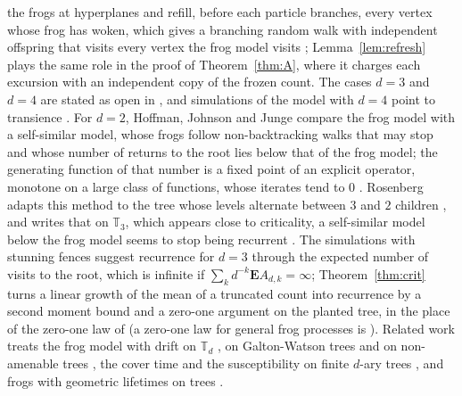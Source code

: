 \documentclass[11pt]{amsart}
\theoremstyle{definition}
\numberwithin{equation}{section}
\newcommand{\T}{\mathbb{T}}
\newcommand{\E}{\mathbf{E}}
\begin{document}
the frogs at hyperplanes and refill, before each particle branches, every vertex whose frog has woken, which gives a branching random walk with independent offspring that visits every vertex the frog model visits \cite[proof of Theorem~1.1(ii)]{DGHPW18}; Lemma~\ref{lem:refresh} plays the same role in the proof of Theorem~\ref{thm:A}, where it charges each excursion with an independent copy of the frozen count. The cases $d=3$ and $d=4$ are stated as open in \cite{JJ16,BFJJT19,MR24,MW20,AJ25,Fra26}, and simulations of the model with $d=4$ point to transience \cite[Section~5]{HJJ17}. For $d=2$, Hoffman, Johnson and Junge compare the frog model with a self-similar model, whose frogs follow non-backtracking walks that may stop and whose number of returns to the root lies below that of the frog model; the generating function of that number is a fixed point of an explicit operator, monotone on a large class of functions, whose iterates tend to $0$ \cite[Section~2]{HJJ17}. Rosenberg adapts this method to the tree whose levels alternate between $3$ and $2$ children \cite[Section~2]{Ros18}, and writes that on $\T_3$, which appears close to criticality, a self-similar model below the frog model seems to stop being recurrent \cite[Section~1]{Ros18}. The simulations with stunning fences \cite[Section~5]{HJJ17} suggest recurrence for $d=3$ through the expected number of visits to the root, which is infinite if $\sum_kd^{-k}\E A_{d,k}=\infty$; Theorem~\ref{thm:crit} turns a linear growth of the mean of a truncated count into recurrence by a second moment bound and a zero-one argument on the planted tree, in the place of the zero-one law of \cite[Theorem~4]{HJJ17} (a zero-one law for general frog processes is \cite[Theorem~13]{KZ17}). Related work treats the frog model with drift on $\T_d$ \cite{BFJJT19,GTW22,BJL24,Mat24}, on Galton-Watson trees \cite{MR24,MW20} and on non-amenable trees \cite{MR20}, the cover time and the susceptibility on finite $d$-ary trees \cite{HJJ19,Her18}, and frogs with geometric lifetimes on trees \cite{GR18,Pen24}.
\end{document}
